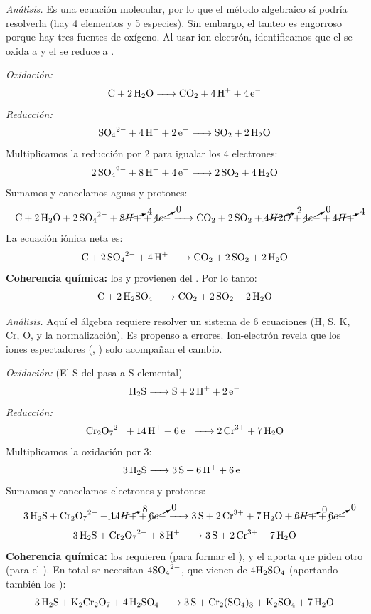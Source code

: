 \medskip
\begin{exercise}{}{}

\textit{Análisis.} Es una ecuación molecular, por lo que el
método algebraico sí podría resolverla (hay 4 elementos y 5
especies). Sin embargo, el tanteo es engorroso porque hay tres
fuentes de oxígeno. Al usar ion-electrón, identificamos que el
 se oxida a  y el  se reduce a .

\textit{Oxidación:}
\[
\ce{C + 2H2O -> CO2 + 4H+ + 4e-}
\]
\textit{Reducción:}
\[
\ce{SO4^{2-} + 4H+ + 2e- -> SO2 + 2H2O}
\]
Multiplicamos la reducción por 2 para igualar los 4 electrones:
\[
\ce{2SO4^{2-} + 8H+ + 4e- -> 2SO2 + 4H2O}
\]
Sumamos y cancelamos aguas y protones:
\[
\ce{
C + 2H2O + 2SO4^{2-} + \cancelto{4}{8H+} + \cancelto{0}{4e-}
-> CO2 + 2SO2 + \cancelto{2}{4H2O} + \cancelto{0}{4e-} + \cancelto{4}{4H+}
}
\]
La ecuación iónica neta es:
\[
\ce{C + 2SO4^{2-} + 4H+ -> CO2 + 2SO2 + 2H2O}
\]
\textbf{Coherencia química:} los  y  provienen del . Por lo tanto:
\[
\ce{C + 2H2SO4 -> CO2 + 2SO2 + 2H2O}
\]
\end{exercise}

\begin{exercise}{}{}

\textit{Análisis.} Aquí el álgebra requiere resolver un sistema de
6 ecuaciones (H, S, K, Cr, O, y la normalización). Es propenso a
errores. Ion-electrón revela que los iones espectadores
(, ) solo acompañan el cambio.

\textit{Oxidación:} (El S del  pasa a S elemental)
\[
\ce{H2S -> S + 2H+ + 2e-}
\]
\textit{Reducción:}
\[
\ce{Cr2O7^{2-} + 14H+ + 6e- -> 2Cr^{3+} + 7H2O}
\]
Multiplicamos la oxidación por 3:
\[
\ce{3H2S -> 3S + 6H+ + 6e-}
\]
Sumamos y cancelamos electrones y protones:
\[
\ce{
3H2S + Cr2O7^{2-} + \cancelto{8}{14H+} + \cancelto{0}{6e-}
-> 3S + 2Cr^{3+} + 7H2O + \cancelto{0}{6H+} + \cancelto{0}{6e-}
}
\]
\[
\ce{3H2S + Cr2O7^{2-} + 8H+ -> 3S + 2Cr^{3+} + 7H2O}
\]
\textbf{Coherencia química:} los  requieren  (para formar el ), y el  aporta  que piden otro  (para el ). En total se necesitan \(4\ce{SO4^{2-}}\), que vienen de \(4\ce{H2SO4}\) (aportando también los ):
\[
\ce{3H2S + K2Cr2O7 + 4H2SO4 -> 3S + Cr2(SO4)3 + K2SO4 + 7H2O}
\]
\end{exercise}

